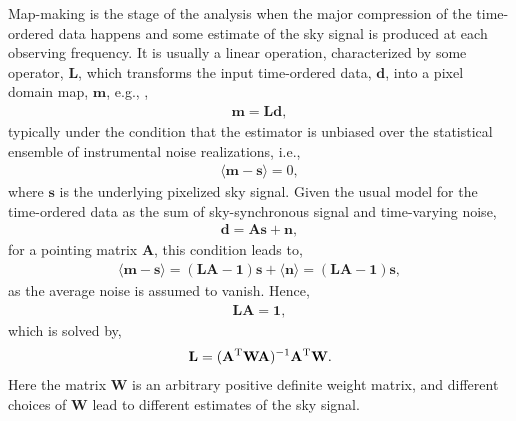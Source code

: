 Map-making is the stage of the analysis when the major compression of the time-ordered data happens and some estimate of the sky signal is produced at each observing frequency. It is usually a linear operation, characterized by some operator, $\mathbf{L}$, which transforms the input time-ordered data, $\mathbf{d}$, into a pixel domain map, $\mathbf{m}$, 
e.g., \cite{Tegmark:1996qs},
\begin{eqnarray}
\mathbf{m} = \mathbf{L}\mathbf{d},
\end{eqnarray}
typically under the condition that the estimator is unbiased over the statistical ensemble of instrumental noise realizations, i.e.,
\begin{eqnarray}
\langle \mathbf{m} - \mathbf{s}\rangle = 0,
\label{eq:condMaps}
\end{eqnarray}
where $\mathbf{s}$ is the underlying pixelized sky signal. Given the usual model for the time-ordered data as the sum of sky-synchronous signal and time-varying noise, 
\begin{eqnarray}
\mathbf{d} = \mathbf{A}\mathbf{s} + \mathbf{n},
\end{eqnarray}
for a pointing matrix $\mathbf{A}$, this condition leads to,
\begin{eqnarray}
\langle \mathbf{m} - \mathbf{s}\rangle =  (\mathbf{L}\mathbf{A}-\mathbf{1})\mathbf{s} 
+ \langle \mathbf{n} \rangle = (\mathbf{L}\mathbf{A}-\mathbf{1})\mathbf{s},
\end{eqnarray}
as the average noise is assumed to vanish. Hence,
\begin{eqnarray}
\mathbf{L}\mathbf{A} = \mathbf{1},
\end{eqnarray}
which is solved by,
\begin{eqnarray}
\mathbf{L} = (\mathbf{A}^{\rm T} \mathbf{W} \mathbf{A})^{-1} \mathbf{A}^{\rm T} \mathbf{W}.
\end{eqnarray}
Here the matrix $\mathbf{W}$ is an arbitrary positive definite weight matrix, and different choices of $\mathbf{W}$ lead to different estimates of the sky signal.
